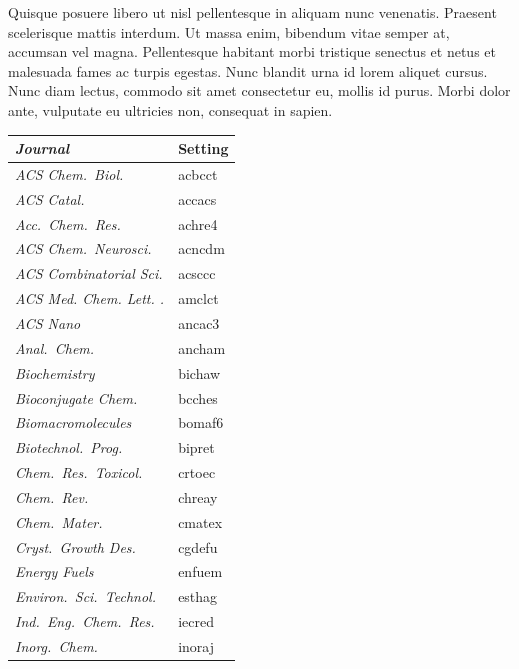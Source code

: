 \documentclass[english,journal=jctcce,etalmode=truncate,maxauthors=0]{achemso}
\begin{document}
Quisque posuere libero ut nisl pellentesque in aliquam nunc venenatis. Praesent scelerisque mattis interdum. Ut massa enim, bibendum vitae semper at, accumsan vel magna. Pellentesque habitant morbi tristique senectus et netus et malesuada fames ac turpis egestas. Nunc blandit urna id lorem aliquet cursus. Nunc diam lectus, commodo sit amet consectetur eu, mollis id purus. Morbi dolor ante, vulputate eu ultricies non, consequat in sapien.

\begin{table}
  \centering
  \begin{tabular}{>{\itshape}l>{\ttfamily}l}
    \toprule
      Journal                  & Setting \\
    \midrule
      ACS Chem.\ Biol.         & acbcct  \\
      ACS Catal.               & accacs  \\
      Acc.\ Chem.\ Res.        & achre4  \\
      ACS Chem.\ Neurosci.     & acncdm  \\
      ACS Combinatorial Sci.   & acsccc  \\
      ACS Med. Chem. Lett. .   & amclct  \\
      ACS Nano                 & ancac3  \\
      Anal.\ Chem.             & ancham  \\
      Biochemistry             & bichaw  \\
      Bioconjugate Chem.       & bcches  \\
      Biomacromolecules        & bomaf6  \\
      Biotechnol.\ Prog.       & bipret  \\
      Chem.\ Res.\ Toxicol.    & crtoec  \\
      Chem.\ Rev.              & chreay  \\
      Chem.\ Mater.            & cmatex  \\
      Cryst.\ Growth Des.      & cgdefu  \\
      Energy Fuels             & enfuem  \\
      Environ.\ Sci.\ Technol. & esthag  \\
      Ind.\ Eng.\ Chem.\ Res.  & iecred  \\
      Inorg.\ Chem.            & inoraj  \\

\end{tabular}
\end{table}
\end{document}
